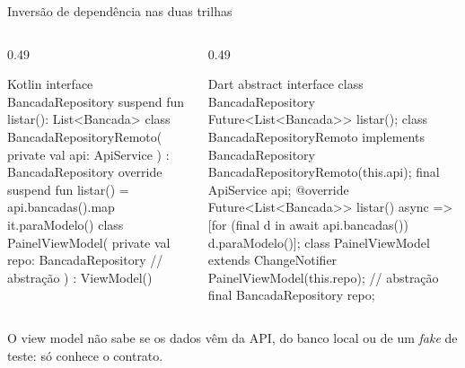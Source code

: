 \documentclass[aspectratio=169,10pt]{beamer}
\begin{document}
\begin{frame}[fragile]{Inversão de dependência nas duas trilhas}
  \begin{columns}[T]
    \begin{column}{0.49\textwidth}
\begin{codigo}[title=Kotlin]{Kotlin}
interface BancadaRepository {
  suspend fun listar(): List<Bancada>
}
class BancadaRepositoryRemoto(
  private val api: ApiService
) : BancadaRepository {
  override suspend fun listar() =
    api.bancadas().map { it.paraModelo() }
}
class PainelViewModel(
  private val repo: BancadaRepository  // abstração
) : ViewModel()
\end{codigo}
    \end{column}
    \begin{column}{0.49\textwidth}
\begin{codigo}[title=Dart]{Dart}
abstract interface class BancadaRepository {
  Future<List<Bancada>> listar();
}
class BancadaRepositoryRemoto
    implements BancadaRepository {
  BancadaRepositoryRemoto(this.api);
  final ApiService api;
  @override
  Future<List<Bancada>> listar() async =>
      [for (final d in await api.bancadas()) d.paraModelo()];
}
class PainelViewModel extends ChangeNotifier {
  PainelViewModel(this.repo);   // abstração
  final BancadaRepository repo;
}
\end{codigo}
    \end{column}
  \end{columns}
  \begin{destaque}
    O view model não sabe se os dados vêm da API, do banco local ou de um \emph{fake} de teste: só conhece o contrato.
  \end{destaque}
\end{frame}
\end{document}
